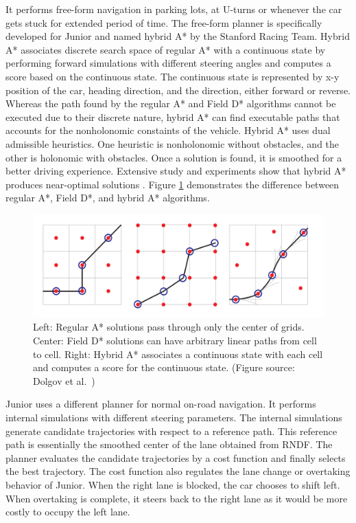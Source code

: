 It performs free-form navigation in parking lots, at U-turns or whenever the
car gets stuck for extended period of time. The free-form planner is
specifically developed for Junior and named hybrid A* by the Stanford Racing
Team. Hybrid A* associates discrete search space of regular A* with a
continuous state by performing forward simulations with different steering
angles and computes a score based on the continuous state. The continuous state
is represented by x-y position of the car, heading direction, and the
direction, either forward or reverse. Whereas the path found by the regular A*
and Field D* algorithms cannot be executed due to their discrete nature, hybrid
A* can find executable paths that accounts for the nonholonomic constaints of
the vehicle. Hybrid A* uses dual admissible heuristics. One heuristic is
nonholonomic without obstacles, and the other is holonomic with obstacles. Once
a solution is found, it is smoothed for a better driving experience. Extensive
study and experiments show that hybrid A* produces near-optimal solutions
\cite{Dolgov2010PathPF, Petereit2012Application}. Figure
\ref{figure:hybridastar-comparison} demonstrates the difference between regular
A*, Field D*, and hybrid A* algorithms.

\begin{figure}[h]
  \centering
  \includegraphics[width=.8\textwidth]{figures/hybridastar-comparison.png}
  \caption[A*, Field D* and Hybrid A* algorithms]{Left: Regular A* solutions
    pass through only the center of grids. Center: Field D* solutions can
    have arbitrary linear paths from cell to cell. Right: Hybrid A* associates
    a continuous state with each cell and computes a score for the continuous
  state. (Figure source: Dolgov et al.\ \cite{Dolgov2010PathPF})}
  \label{figure:hybridastar-comparison}
\end{figure}

Junior uses a different planner for normal on-road navigation. It performs
internal simulations with different steering parameters. The internal
simulations generate candidate trajectories with respect to a reference path.
This reference path is essentially the smoothed center of the lane obtained
from RNDF. The planner evaluates the candidate trajectories by a cost function
and finally selects the best trajectory. The cost function also regulates the
lane change or overtaking behavior of Junior. When the right lane is blocked,
the car chooses to shift left. When overtaking is complete, it steers back
to the right lane as it would be more costly to occupy the left lane.

